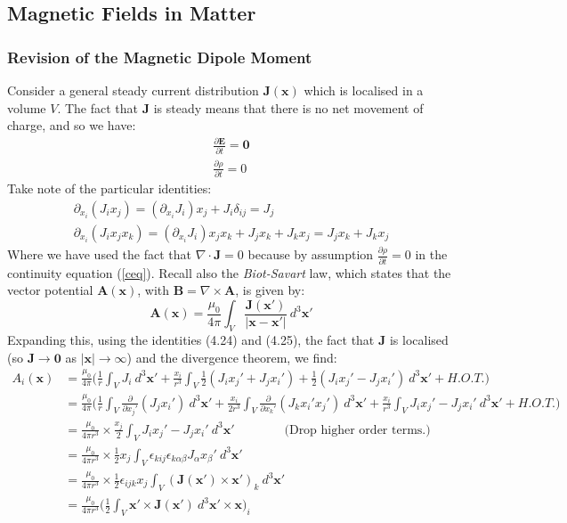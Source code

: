 \documentclass[a4paper]{article}
\numberwithin{equation}{section}
\begin{document}
\subsection{Magnetic Fields in Matter}
\subsubsection{Revision of the Magnetic Dipole Moment}
Consider a general steady current distribution $\mathbf{J}(\mathbf{x})$ which is localised in a volume $V$. The fact that $\mathbf{J}$ is steady means that there is no net movement of charge, and so we have:
\begin{gather}
\frac{\partial \mathbf{E}}{\partial t}=\mathbf{0} \\
\frac{\partial \rho}{\partial t}=0
\end{gather} 
Take note of the particular identities:
\begin{gather}
\partial_{x_i}(J_i x_j) = (\partial_{x_i}J_i)x_j+J_i\delta_{ij} = J_j\\
\partial_{x_i}(J_ix_jx_k)=(\partial_{x_i}J_i)x_jx_k + J_jx_k+J_kx_j =J_jx_k + J_kx_j
\end{gather}
Where we have used the fact that $\nabla \cdot \mathbf{J} = 0 $ because by assumption $\frac{\partial \rho}{\partial t}=0$ in the continuity equation (\ref{ceq}). Recall also the \textit{Biot-Savart} law, which states that the vector potential $\mathbf{A}(\mathbf{x})$, with $\mathbf{B} = \nabla \times \mathbf{A}$, is given by:
\begin{equation} \label{vec pot2}
\mathbf{A}(\mathbf{x}) = \frac{\mu_0}{4 \pi} \int_V \frac{\mathbf{J}(\mathbf{x}')}{|\mathbf{x}-\mathbf{x}'|} \ d^3 \mathbf{x}'
\end{equation}
Expanding this, using the identities (4.24) and (4.25), the fact that $\mathbf{J}$ is localised (so $\mathbf{J}\rightarrow \mathbf{0}$ as $|\mathbf{x}| \rightarrow \infty$) and the divergence theorem, we find:
\begin{align*}
A_i(\mathbf{x})&=\frac{\mu_0}{4 \pi} \bigg(\frac{1}{r} \int_V J_i \ d^3\mathbf{x}'+\frac{x_i}{r^3}\int_V \frac{1}{2}(J_ix_j'+J_jx_i')+\frac{1}{2}(J_ix_j'-J_jx_i') \ d^3 \mathbf{x}' + H.O.T. \bigg) \\
&=\frac{\mu_0}{4 \pi} \bigg( \frac{1}{r}\int_V \frac{\partial}{\partial x_j'}(J_jx_i') \ d^3\mathbf{x}' + \frac{x_i}{2r^3}\int_V \frac{\partial}{\partial x_k'}(J_k x_i' x_j') \ d^3 \mathbf{x}' +\frac{x_i}{r^3} \int_V J_i x_j' - J_j x_i' \ d^3 \mathbf{x}' + H.O.T.  \bigg) \\
&=\frac{\mu_0}{4 \pi r^3} \times \frac{x_j}{2} \int_V J_i x_j' - J_j x_i' \ d^3 \mathbf{x}' \qquad \qquad \text{(Drop higher order terms.)} \\
&=\frac{\mu_0}{4 \pi r^3} \times \frac{1}{2}x_j \int_V \epsilon_{kij} \epsilon_{k\alpha \beta}J_\alpha x_\beta ' \ d^3 \mathbf{x}' \\
&=\frac{\mu_0}{4 \pi r^3} \times \frac{1}{2} \epsilon_{ijk} x_j \int_V (\mathbf{J}(\mathbf{x}') \times \mathbf{x}')_k \ d^3 \mathbf{x}' \\
&=\frac{\mu_0}{4 \pi r^3} \bigg(\frac{1}{2} \int_V \mathbf{x}' \times \mathbf{J}(\mathbf{x}') \ d^3 \mathbf{x}' \times \mathbf{x} \bigg)_i
\end{align*} 
\end{document}
